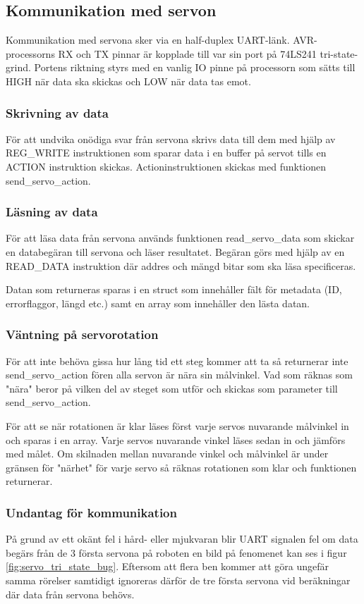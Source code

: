 \documentclass[a4paper,titlepage,12pt]{article}
\begin{document}
	\subsection{Kommunikation med servon}
	Kommunikation med servona sker via en half-duplex UART-länk. AVR-processorns RX
	och TX pinnar är kopplade till var sin port på 74LS241 tri-state-grind. Portens riktning
	styrs med en vanlig IO pinne på processorn som sätts till HIGH när data ska skickas 
	och LOW när data tas emot. 

	\subsubsection{Skrivning av data}
	För att undvika onödiga svar från servona skrivs data till dem med hjälp av REG\_WRITE
	instruktionen som sparar data i en buffer på servot tills en ACTION instruktion skickas.
	Actioninstruktionen skickas med funktionen send\_servo\_action.
	
	\subsubsection{Läsning av data}
	För att läsa data från servona används funktionen read\_servo\_data som skickar en 
	databegäran till servona och läser resultatet. Begäran görs med hjälp av en
	READ\_DATA instruktion där addres och mängd bitar som ska läsa specificeras.
	
	Datan som returneras sparas i en struct som innehåller fält för metadata 
	(ID, errorflaggor, längd etc.) samt en array som innehåller den lästa datan.
	
	\subsubsection{Väntning på servorotation}
	För att inte behöva gissa hur lång tid ett steg kommer att ta så returnerar inte
	send\_servo\_action fören alla servon är nära sin målvinkel. Vad som räknas som "nära"
	beror på vilken del av steget som utför och skickas som parameter till 
	send\_servo\_action.

	För att se när rotationen är klar läses först varje servos nuvarande målvinkel in och
	sparas i en array. Varje servos nuvarande vinkel läses sedan in och jämförs med målet.
	Om skilnaden mellan nuvarande vinkel och målvinkel är under gränsen för "närhet" för
	varje servo så räknas rotationen som klar och funktionen returnerar.

	\subsubsection{Undantag för kommunikation}
	På grund av ett okänt fel i hård- eller mjukvaran blir UART signalen fel om data 
	begärs från de 3 första servona på roboten en bild på fenomenet kan ses i figur 
	\ref{fig:servo_tri_state_bug}. Eftersom att flera ben kommer att göra ungefär samma 
	rörelser samtidigt ignoreras därför de tre första servona vid beräkningar där data
	från servona behövs.
\end{document}
